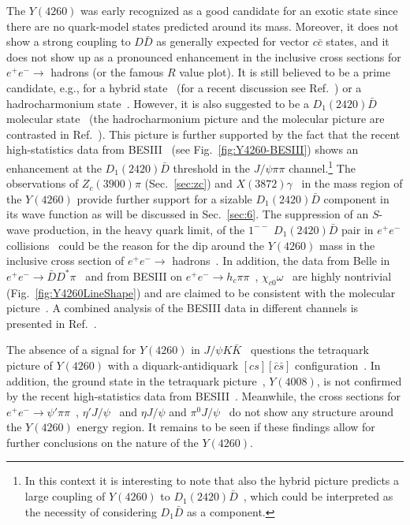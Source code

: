 The $Y(4260)$ was early recognized as a good candidate for an exotic state since
there are no quark-model states predicted around its mass.
Moreover, it does not show a strong coupling to $D\bar D$ as generally expected
for vector $c\bar c$ states, and it does not show up as a pronounced enhancement
in the inclusive cross sections for $e^+e^-\to$ hadrons (or the famous $R$ value
plot).
It is still believed to be a prime candidate, e.g., for a hybrid
state~\cite{Close:2005iz} (for a recent discussion see
Ref.~\cite{Kalashnikova:2016bta}) or a hadrocharmonium
state~\cite{Dubynskiy:2008mq,Li:2013ssa}.
However, it is also suggested to be a $D_1(2420)\bar D$ molecular
state~\cite{Ding:2008gr,Wang:2013cya,Cleven:2013mka,Li:2013bca,Li:2013yla,
Wu:2013onz} (the hadrocharmonium picture and the molecular picture are
contrasted in Ref.~\cite{Wang:2013kra}).
This picture is further supported by the fact that  the recent high-statistics
data from BESIII~\cite{Ablikim:2016qzw}  (see Fig.~\ref{fig:Y4260-BESIII}) shows
an enhancement at the $D_1(2420)\bar D$ threshold in the $J/\psi\pi\pi$
channel.\footnote{In this  context it is interesting to note that also the
hybrid picture predicts a large coupling of $Y(4260)$ to $D_1(2420)\bar
D$~\cite{Barnes:1995hc,Close:2005iz,Kou:2005gt}, which could be
interpreted as the necessity of considering $D_1\bar D$ as a component.} The
observations of $Z_c(3900)\pi$ (Sec.~\ref{sec:zc}) and
$X(3872)\gamma$~\cite{Ablikim:2013dyn} in the mass region of the $Y(4260)$
provide further support for a sizable $D_1(2420)\bar D$ component in its wave
function as will be discussed in Sec.~\ref{sec:6}.
The suppression of an $S$-wave production, in the heavy quark limit, of the
$1^{--}$ $D_1(2420)\bar D$ pair in $e^+e^-$
collisions~\cite{Eichten:1978tg,Eichten:1979ms,Li:2013yka} could be the reason
for the dip around the $Y(4260)$ mass in the inclusive cross section of
$e^+e^-\to$ hadrons~\cite{Wang:2013kra}.
In addition,  the data from Belle in $e^+e^-\to
\bar{D}D^*\pi$~\cite{Pakhlova:2009jv} and from BESIII on $e^+e^-\to
h_c\pi\pi$~\cite{BESIII:2016adj}, $\chi_{c0}\omega$~\cite{Ablikim:2014qwy}  are
highly nontrivial (Fig.~\ref{fig:Y4260LineShape}) and are claimed to be
consistent with the molecular picture~\cite{Cleven:2013mka,Cleven:2016qbn}.
A combined analysis of the BESIII data in different channels is presented in
Ref.~\cite{Gao:2017sqa}.

The absence of a signal for $Y(4260)$ in $J/\psi
K\bar{K}$~\cite{He:2006kg,Yuan:2007bt,Shen:2014gdm} questions the tetraquark
picture of $Y(4260)$ with a diquark-antidiquark $[cs][\bar c\bar s]$
configuration~\cite{Esposito:2014rxa}.
In addition, the ground state in the tetraquark picture~\cite{Esposito:2014rxa},
$Y(4008)$, is not confirmed by the recent high-statistics data from
BESIII~\cite{Ablikim:2016qzw}.
Meanwhile, the cross sections for $e^+e^-\to
\psi'\pi\pi$~\cite{Aubert:2007zz,Wang:2007ea}, $\eta'
J/\psi$~\cite{Ablikim:2016ymr} and $\eta J/\psi$ and $\pi^0
J/\psi$~\cite{Ablikim:2015xhk} do not show any structure around the $Y(4260)$
energy region. It remains to be seen if these findings allow for further conclusions on the nature of 
 the $Y(4260)$.

